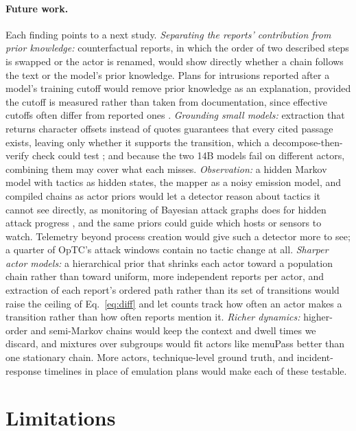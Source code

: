 \documentclass[letterpaper]{article}
\begin{document}
\paragraph{Future work.} Each finding points to a next study. \emph{Separating the reports' contribution from prior knowledge:} counterfactual reports, in which the order of two described steps is swapped or the actor is renamed, would show directly whether a chain follows the text or the model's prior knowledge. Plans for intrusions reported after a model's training cutoff would remove prior knowledge as an explanation, provided the cutoff is measured rather than taken from documentation, since effective cutoffs often differ from reported ones \citep{cheng2024dated}. \emph{Grounding small models:} extraction that returns character offsets instead of quotes guarantees that every cited passage exists, leaving only whether it supports the transition, which a decompose-then-verify check could test \citep{wanner2025dndscore}; and because the two 14B models fail on different actors, combining them may cover what each misses. \emph{Observation:} a hidden Markov model with tactics as hidden states, the mapper as a noisy emission model, and compiled chains as actor priors would let a detector reason about tactics it cannot see directly, as monitoring of Bayesian attack graphs does for hidden attack progress \citep{kazeminajafabadi2023monitoring}, and the same priors could guide which hosts or sensors to watch. Telemetry beyond process creation would give such a detector more to see; a quarter of OpTC's attack windows contain no tactic change at all. \emph{Sharper actor models:} a hierarchical prior that shrinks each actor toward a population chain rather than toward uniform, more independent reports per actor, and extraction of each report's ordered path rather than its set of transitions would raise the ceiling of Eq.~\eqref{eq:diff} and let counts track how often an actor makes a transition rather than how often reports mention it. \emph{Richer dynamics:} higher-order and semi-Markov chains would keep the context and dwell times we discard, and mixtures over subgroups would fit actors like menuPass better than one stationary chain. More actors, technique-level ground truth, and incident-response timelines in place of emulation plans would make each of these testable.

\section{Limitations}
\end{document}
